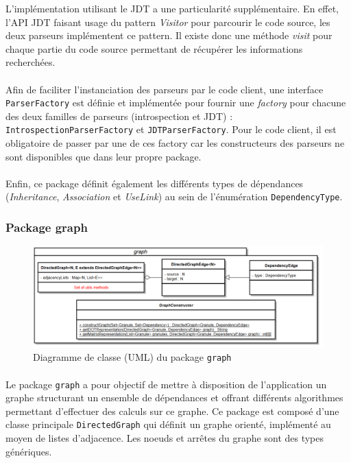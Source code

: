 \documentclass{scrartcl}
\begin{document}
	L'implémentation utilisant le JDT a une particularité supplémentaire. En effet, l'API JDT faisant usage du pattern \emph{Visitor} pour parcourir le code source, les deux parseurs implémentent ce pattern. Il existe donc une méthode \emph{visit} pour chaque partie du code source permettant de récupérer les informations recherchées.
	
	\paragraph{} Afin de faciliter l'instanciation des parseurs par le code client, une interface \texttt{ParserFactory} est définie et implémentée pour fournir une \emph{factory} pour chacune des deux familles de parseurs (introspection et JDT) : \texttt{IntrospectionParserFactory} et \texttt{JDTParserFactory}. Pour le code client, il est obligatoire de passer par une de ces factory car les constructeurs des parseurs ne sont disponibles que dans leur propre package.
	
	\paragraph{} Enfin, ce package définit également les différents types de dépendances (\emph{Inheritance}, \emph{Association} et \emph{UseLink}) au sein de l'énumération \texttt{DependencyType}.
    
\subsubsection{Package graph}

    \begin{figure}[H]
        \centering
        \includegraphics[width=\textwidth]{img/uml/graph.png}
        \caption{Diagramme de classe (UML) du package \texttt{graph}}
    \end{figure}

    \paragraph{}Le package \texttt{graph} a pour objectif de mettre à disposition de l’application un graphe structurant un ensemble de dépendances et offrant différents algorithmes permettant d’effectuer des calculs sur ce graphe. Ce package est composé d’une classe principale \texttt{DirectedGraph} qui définit un graphe orienté, implémenté au moyen de listes d'adjacence. Les noeuds et arrêtes du graphe sont des types génériques.
    
\end{document}

